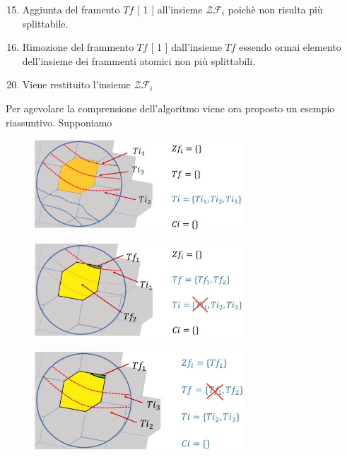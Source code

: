 \begin{enumerate}
	\setcounter{enumi}{14}
	\item Aggiunta del framento $Tf$ [ 1 ] all'insieme $\mathcal{ZF}_i$  poichè non risulta più splittabile.
	\item Rimozione del frammento $Tf$ [ 1 ] dall'insieme $Tf$ essendo ormai elemento dell'insieme dei frammenti atomici non più splittabili.
\end{enumerate}
\begin{enumerate}
		\setcounter{enumi}{19}
		\item Viene restituito l'insieme $\mathcal{ZF}_i$
\end{enumerate}
	Per agevolare la comprensione dell'algoritmo viene ora proposto un esempio riassuntivo. Supponiamo 
	
	\begin{figure}[h]
		\centering
		\includegraphics[width=0.7\textwidth]{images/pseudo1}
		\caption{}
		\label{pseudo1}
	\end{figure}
	
	\begin{figure}[h]
		\centering
		\includegraphics[width=0.7\textwidth]{images/pseudo2}
		\caption{}
		\label{pseudo2}
	\end{figure}
	
	\begin{figure}[h]
		\centering
		\includegraphics[width=0.7\textwidth]{images/pseudo3}
		\caption{}
		\label{pseudo3}
	\end{figure}
	
